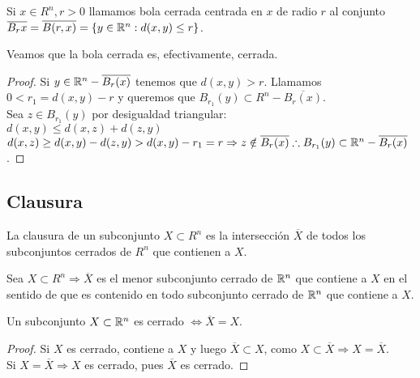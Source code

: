 \begin{definition}
  Si $x \in R^n, r > 0$ llamamos bola cerrada centrada en $x$ de radio $r$ al conjunto $\overline{B_r{x}} = \overline{B(r, x)} = \{ y \in \mathbb{R}^n : d(x, y) \leq r \}$.
\end{definition}

\begin{prop}
  Veamos que la bola cerrada es, efectivamente, cerrada.
  \begin{proof}
    Si $y \in \mathbb{R}^n - \overline{B_r(x)}$ tenemos que $d(x, y) > r$. Llamamos $0 < r_1 = d(x, y) - r$ y queremos que $B_{r_1}(y) \subset R^n - \overline{B_r(x)}$. \\
    Sea $z \in B_{r_1}(y)$ por desigualdad triangular: \\
    $d(x, y) \leq d(x, z) + d(z, y)$ \\
    $d(x, z) \geq d(x, y) - d(z, y) > d(x, y) - r_1 = r \Rightarrow z \notin \overline{B_r(x)} \therefore B_{r_1}(y) \subset \mathbb{R}^n - \overline{B_r(x)}$.
  \end{proof}
\end{prop}

\subsection{Clausura}

\begin{definition}[Clausura]
  La clausura de un subconjunto $X \subset R^n$ es la intersección $\overline{X}$ de todos los subconjuntos cerrados de $R^n$ que contienen a $X$.
\end{definition}

\begin{prop}
  Sea $X \subset R^n \Rightarrow \overline{X}$ es el menor subconjunto cerrado de $\mathbb{R}^n$ que contiene a $X$ en el sentido de que es contenido en todo subconjunto cerrado de $\mathbb{R}^n$ que contiene a $X$.
\end{prop}

\begin{corollary}
  Un subconjunto $X \subset \mathbb{R}^n$ es cerrado $\iff \overline{X} = X$.
  \begin{proof}
    Si $X$ es cerrado, contiene a $X$ y luego $\overline{X} \subset X$, como $X \subset \overline{X} \Rightarrow X = \overline{X}$. \\
    Si $X = \overline{X} \Rightarrow X$ es cerrado, pues $\overline{X}$ es cerrado.
  \end{proof}
\end{corollary}

